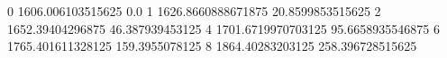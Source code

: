0 1606.006103515625 0.0
1 1626.8660888671875 20.8599853515625
2 1652.39404296875 46.387939453125
4 1701.6719970703125 95.6658935546875
6 1765.401611328125 159.3955078125
8 1864.40283203125 258.396728515625

